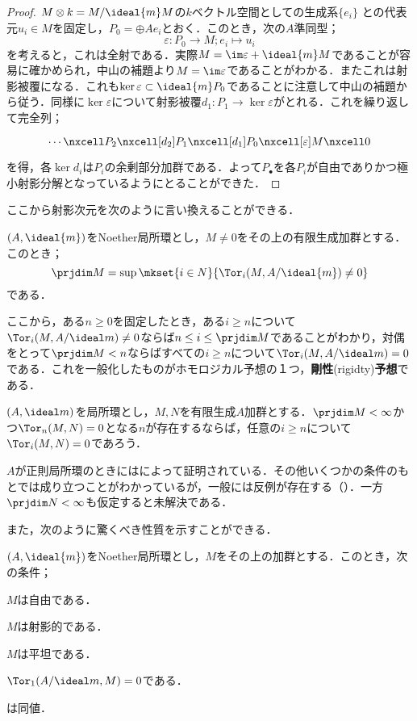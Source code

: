 \begin{proof}
	$M\otimes k=M/\ideal{m}M$の$k$ベクトル空間としての生成系$\{e_i\}$
	との代表元$u_i\in M$を固定し，$P_0=\oplus Ae_i$とおく．このとき，次の$A$準同型；
	\[\varepsilon:P_0\to M;e_i\mapsto u_i\]
	を考えると，これは全射である．実際$M=\im\varepsilon+\ideal{m}M$であることが容易に確かめられ，中山の補題より$M=\im\varepsilon$であることがわかる．またこれは射影被覆になる．これも$\ker\varepsilon\subset\ideal{m}P_0$であることに注意して中山の補題から従う．同様に$\ker\varepsilon$について射影被覆$d_1:P_1\to\ker\varepsilon$がとれる．これを繰り返して完全列；
	\[\begin{tikzcd}
	\cdots\nxcell P_2\nxcell[d_2]P_1\nxcell[d_1]P_0\nxcell[\varepsilon]M\nxcell0
	\end{tikzcd}\]
	を得，各$\ker d_i$は$P_i$の余剰部分加群である．よって$P_\bullet$を各$P_i$が自由でありかつ極小射影分解となっているようにとることができた．
\end{proof}

ここから射影次元を次のように言い換えることができる．

\begin{thm}\label{thm:射影次元の言い換え}
	$(A,\ideal{m})$をNoether局所環とし，$M\neq0$をその上の有限生成加群とする．このとき；
	\[\prjdim M=\sup\mkset{i\in N}{\Tor_i(M,A/\ideal{m})\neq0}\]
	である．
\end{thm}

ここから，ある$n\geq0$を固定したとき，ある$i\geq n$について$\Tor_i(M,A/\ideal m)\neq0$ならば$n\leq i\leq\prjdim M$であることがわかり，対偶をとって$\prjdim M<n$ならばすべての$i\geq n$について$\Tor_i(M,A/\ideal m)=0$である．これを一般化したものがホモロジカル予想の１つ，\textbf{剛性}(rigidty)\textbf{予想}である．

\begin{conj}[剛性予想]
	$(A,\ideal m)$を局所環とし，$M,N$を有限生成$A$加群とする．$\prjdim M<\infty$かつ$\Tor_n(M,N)=0$となる$n$が存在するならば，任意の$i\geq n$について$\Tor_i(M,N)=0$であろう．
\end{conj}

$A$が正則局所環のときには\cite{lichtenbaum1966}によって証明されている．その他いくつかの条件のもとでは成り立つことがわかっているが，一般には反例が存在する（\cite{heitmann1993counterexample}）．一方$\prjdim N<\infty$も仮定すると未解決である．

また，次のように驚くべき性質を示すことができる．

\begin{prop}\label{prop:Noether局所環上では自由なり射影なり同値}
	$(A,\ideal{m})$をNoether局所環とし，$M$をその上の加群とする．このとき，次の条件；
	\begin{sakura}
		\item $M$は自由である．
		\item $M$は射影的である．
		\item $M$は平坦である．
		\item $\Tor_1(A/\ideal m,M)=0$である．
	\end{sakura}
	は同値．
\end{prop}

